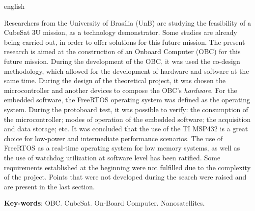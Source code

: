 \begin{resumo}[Abstract]
 \begin{otherlanguage*}{english}
 	
Researchers from the University of Brasília (UnB) are studying the feasibility of a CubeSat 3U mission, as a technology demonstrator. Some studies are already being carried out, in order to offer solutions for this future mission. The present research is aimed at the construction of an Onboard Computer (OBC) for this future mission. During the development of the OBC, it was used the co-design methodology, which allowed for the development of hardware and software at the same time. During the design of the theoretical project, it was chosen the microcontroller and another devices to compose the OBC's \textit {hardware}. For the embedded software, the FreeRTOS operating system was defined as the operating system. During the protoboard test, it was possible to verify: the consumption of the microcontroller; modes of operation of the embedded software; the acquisition and data storage; etc. It was concluded that the use of the TI MSP432 is a great choice for low-power and intermediate performance scenarios. The use of FreeRTOS as a real-time operating system for low memory systems, as well as the use of watchdog utilization at software level has been ratified. Some requirements established at the beginning were not fulfilled due to the complexity of the project. Points that were not developed during the search were raised and are present in the last section.
   \vspace{\onelineskip}
 
   \noindent 
   \textbf{Key-words}: OBC. CubeSat. On-Board Computer. Nanosatellites.
 \end{otherlanguage*}
\end{resumo}
